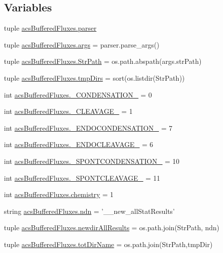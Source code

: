 \subsection*{Variables}
\begin{DoxyCompactItemize}
\item 
tuple \hyperlink{a00126_adba84e3872cb47cad219837458e56677}{acs\+Buffered\+Fluxes.\+parser}
\item 
tuple \hyperlink{a00126_afa2d0b9fb021746e05cd06277997da04}{acs\+Buffered\+Fluxes.\+args} = parser.\+parse\+\_\+args()
\item 
tuple \hyperlink{a00126_a82e861baaf9ae17ee61c8105afcffb8d}{acs\+Buffered\+Fluxes.\+Str\+Path} = os.\+path.\+abspath(args.\+str\+Path)
\item 
tuple \hyperlink{a00126_af740eb0100dc7010628161baeaf9b474}{acs\+Buffered\+Fluxes.\+tmp\+Dirs} = sort(os.\+listdir(Str\+Path))
\item 
int \hyperlink{a00126_aad87b9d241bea71df95c318686aca066}{acs\+Buffered\+Fluxes.\+\_\+\+C\+O\+N\+D\+E\+N\+S\+A\+T\+I\+O\+N\+\_\+} = 0
\item 
int \hyperlink{a00126_af81d6d0377f4d99177961a5604f58ed2}{acs\+Buffered\+Fluxes.\+\_\+\+C\+L\+E\+A\+V\+A\+G\+E\+\_\+} = 1
\item 
int \hyperlink{a00126_a0637697acae236afe5e5ae8dc1d85431}{acs\+Buffered\+Fluxes.\+\_\+\+E\+N\+D\+O\+C\+O\+N\+D\+E\+N\+S\+A\+T\+I\+O\+N\+\_\+} = 7
\item 
int \hyperlink{a00126_a4535f1f4043aef3195766733626b61e4}{acs\+Buffered\+Fluxes.\+\_\+\+E\+N\+D\+O\+C\+L\+E\+A\+V\+A\+G\+E\+\_\+} = 6
\item 
int \hyperlink{a00126_a33ff8ddc4a26ccd45029e2b369391aba}{acs\+Buffered\+Fluxes.\+\_\+\+S\+P\+O\+N\+T\+C\+O\+N\+D\+E\+N\+S\+A\+T\+I\+O\+N\+\_\+} = 10
\item 
int \hyperlink{a00126_a485cf1077a4ece847800617ede00e458}{acs\+Buffered\+Fluxes.\+\_\+\+S\+P\+O\+N\+T\+C\+L\+E\+A\+V\+A\+G\+E\+\_\+} = 11
\item 
int \hyperlink{a00126_ab4fd705796fd835a4238fecdc3caf76e}{acs\+Buffered\+Fluxes.\+chemistry} = 1
\item 
string \hyperlink{a00126_a5df7e71a36351afd3e59d6f50a94bdaf}{acs\+Buffered\+Fluxes.\+ndn} = '\+\_\+\_\+new\+\_\+all\+Stat\+Results'
\item 
tuple \hyperlink{a00126_ae53bd92b0509a8f35e92e734a7f4b4e1}{acs\+Buffered\+Fluxes.\+newdir\+All\+Results} = os.\+path.\+join(Str\+Path, ndn)
\item 
tuple \hyperlink{a00126_a7883e37b9556e49968e7a7dd08893bfb}{acs\+Buffered\+Fluxes.\+tot\+Dir\+Name} = os.\+path.\+join(Str\+Path,tmp\+Dir)

\end{DoxyCompactItemize}
